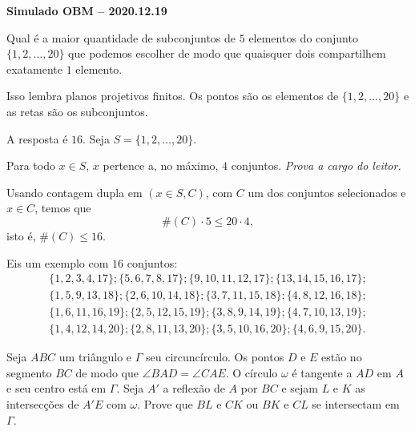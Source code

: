 \documentclass[10pt, a4paper]{article}
\begin{document}
\begin{center}
	\textbf{Simulado OBM -- 2020.12.19}\\
\end{center}

\begin{prob}
	Qual é a maior quantidade de subconjuntos de $5$ elementos do conjunto $\{1, 2, \dots, 20\}$ que podemos escolher de modo que quaisquer dois compartilhem exatamente $1$ elemento.
\end{prob}

\begin{sk}
	Isso lembra planos projetivos finitos. Os pontos são os elementos de $\{1, 2, \dots, 20\}$ e as retas são os subconjuntos.
\end{sk}

\begin{sol}
	A resposta é $16$. Seja $S = \{1, 2, \dots, 20\}$.

	Para todo $x \in S$, $x$ pertence a, no máximo, $4$ conjuntos. \emph{Prova a cargo do leitor.}

	Usando contagem dupla em $(x \in S, C)$, com $C$ um dos conjuntos selecionados e $x \in C$, temos que \[\#(C) \cdot 5 \le 20 \cdot 4,\]
	isto é, $\#(C) \le 16$.

	Eis um exemplo com $16$ conjuntos:
	\begin{gather*}
		\{	1,  2,  3,  4,  17 \};
	\{	5,  6,  7,  8,  17 \};
	\{	9,  10, 11, 12, 17 \};
	\{	13, 14, 15, 16, 17 \};\\
	\{	1,  5,  9,  13, 18 \};
	\{	2,  6,  10, 14, 18 \};
	\{	3,  7,  11, 15, 18 \};
	\{	4,  8,  12, 16, 18 \};\\
	\{	1,  6,  11, 16, 19 \};
	\{	2,  5,  12, 15, 19 \};
	\{	3,  8,  9,  14, 19 \};
	\{	4,  7,  10, 13, 19 \};\\
	\{	1,  4,  12, 14, 20 \};
	\{	2,  8,  11, 13, 20 \};
	\{	3,  5,  10, 16, 20 \};
	\{	4,  6,  9,  15, 20 \}.
	\end{gather*}
\end{sol}

\begin{prob}
	Seja $ABC$ um triângulo e $\Gamma$ seu circuncírculo. Os pontos $D$ e $E$ estão no segmento $BC$ de modo que  $\angle BAD = \angle CAE$. O círculo  $\omega$ é tangente a $AD$ em $A$ e seu centro está em $\Gamma$. Seja $A'$ a reflexão de $A$ por $BC$ e sejam $L$ e $K$ as intersecções de $A'E$ com $\omega$. Prove que $BL$ e $CK$ ou $BK$ e $CL$ se intersectam em $\Gamma$.
\end{prob}
\end{document}
